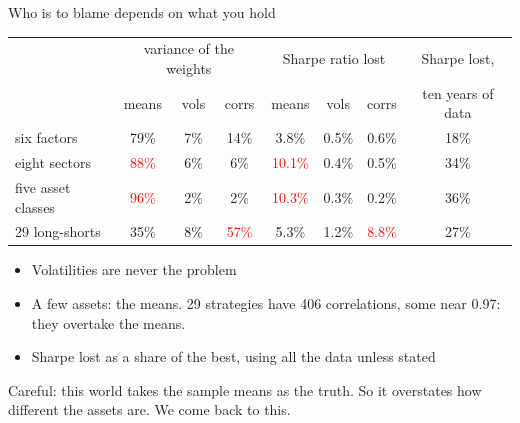 \documentclass[aspectratio=169,10pt]{beamer}
\begin{document}
\begin{frame}{Who is to blame depends on what you hold}
\vskip 2pt
\begin{center}
\renewcommand{\arraystretch}{1.3}
\begin{tabular}{lccc@{\hskip 16pt}ccc@{\hskip 16pt}c}
\toprule
 & \multicolumn{3}{c}{variance of the weights} & \multicolumn{3}{c}{Sharpe ratio lost} & Sharpe lost, \\
 & means & vols & corrs & means & vols & corrs & ten years of data \\
\midrule
six factors & 79\% & 7\% & 14\% & 3.8\% & 0.5\% & 0.6\% & 18\% \\
eight sectors & \textcolor{red}{88\%} & 6\% & 6\% & \textcolor{red}{10.1\%} & 0.4\% & 0.5\% & 34\% \\
five asset classes & \textcolor{red}{96\%} & 2\% & 2\% & \textcolor{red}{10.3\%} & 0.3\% & 0.2\% & 36\% \\
29 long-shorts & 35\% & 8\% & \textcolor{red}{57\%} & 5.3\% & 1.2\% & \textcolor{red}{8.8\%} & 27\% \\
\bottomrule
\end{tabular}
\end{center}
\vskip 8pt
\begin{itemize}
\item Volatilities are never the problem
\vskip 5pt
\item A few assets: the means. 29 strategies have 406 correlations, some near 0.97: they overtake the means.
\vskip 5pt
\item Sharpe lost as a share of the best, using all the data unless stated
\end{itemize}
\vskip 6pt
{\small Careful: this world takes the sample means as the truth. So it overstates how different the assets are. We come back to this.}
\end{frame}
\end{document}
